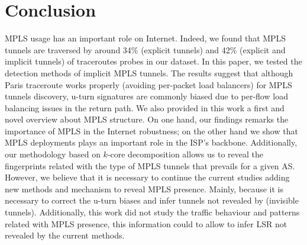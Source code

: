 \section{Conclusion}\label{ccl}

MPLS usage has an important role on Internet. Indeed, we found that MPLS
tunnels are traversed by around 34\% (explicit tunnels) and 42\% (explicit and implicit tunnels) of traceroutes probes in our dataset. In this paper, we tested the detection methods of implicit MPLS tunnels. The results suggest that although Paris traceroute works properly (avoiding per-packet load balancers) for MPLS tunnels discovery,  u-turn signatures are commonly biased due to per-flow load balancing issues in the return path. We also provided in this work a first and novel overview about MPLS structure. On one hand, our findings remarks the importance of MPLS in the Internet robustness; on the other hand we show that MPLS deployments plays an important role in the ISP's backbone.
Additionally, our methodology based on $k$-core decomposition allows us to reveal the fingerprints related with the type of MPLS tunnels that prevails for a given AS. However, we believe that it is necessary to continue the current studies adding new methods and mechanism to reveal MPLS presence. Mainly, because it is necessary to correct the u-turn biases and infer tunnels not revealed by \traceroute (invisible tunnels). Additionally, this work did not study the traffic behaviour and patterns related with MPLS presence, this information could to allow to infer LSR not revealed by the current methods.
